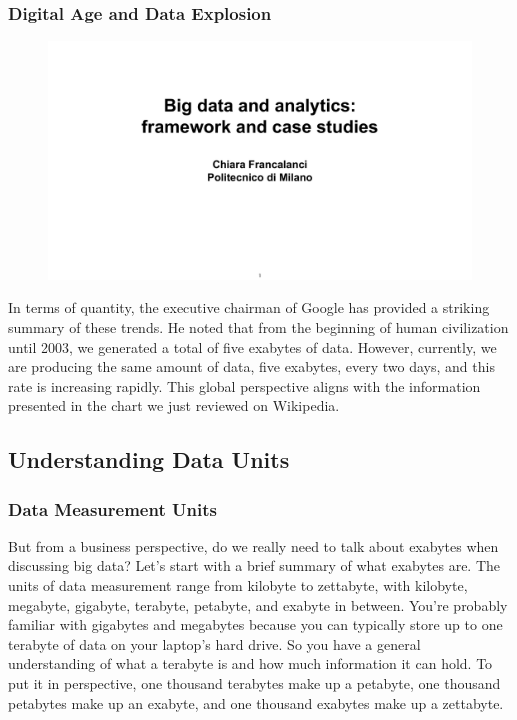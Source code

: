 \subsubsection{Digital Age and Data Explosion}

\begin{figure}[!h]
  \centering
  \includegraphics[page=27, trim = 1.5cm 2cm 1.5cm 3.5cm, clip, width=\imagewidth]{images/06 - BIG_DATA.pdf}
\end{figure}

In terms of quantity, the executive chairman of Google has provided a
striking summary of these trends. He noted that from the beginning of
human civilization until 2003, we generated a total of five exabytes of
data. However, currently, we are producing the same amount of data, five
exabytes, every two days, and this rate is increasing rapidly. This
global perspective aligns with the information presented in the chart we
just reviewed on Wikipedia.

\subsection{Understanding Data Units}

\subsubsection{Data Measurement Units}

But from a business perspective, do we really need to talk about
exabytes when discussing big data? Let's start with a brief summary of
what exabytes are. The units of data measurement range from kilobyte to
zettabyte, with kilobyte, megabyte, gigabyte, terabyte, petabyte, and
exabyte in between. You're probably familiar with gigabytes and
megabytes because you can typically store up to one terabyte of data on
your laptop's hard drive. So you have a general understanding of what a
terabyte is and how much information it can hold. To put it in
perspective, one thousand terabytes make up a petabyte, one thousand
petabytes make up an exabyte, and one thousand exabytes make up a
zettabyte.

